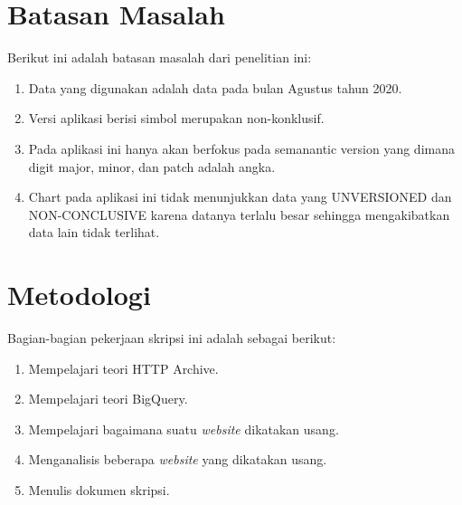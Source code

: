 \section{Batasan Masalah}
\label{sec:batasan}
Berikut ini adalah batasan masalah dari penelitian ini:
\begin{enumerate}
    \item Data yang digunakan adalah data pada bulan Agustus tahun 2020.
    \item Versi aplikasi berisi simbol merupakan non-konklusif.
    \item Pada aplikasi ini hanya akan berfokus pada semanantic version yang dimana digit major, minor, dan patch adalah angka.
    \item Chart pada aplikasi ini tidak menunjukkan data yang UNVERSIONED dan NON-CONCLUSIVE karena datanya terlalu besar sehingga mengakibatkan data lain tidak terlihat.
\end{enumerate}

\section{Metodologi}
\label{sec:metlit}
Bagian-bagian pekerjaan skripsi ini adalah sebagai berikut:
\begin{enumerate}
	\item Mempelajari teori HTTP Archive.
	\item Mempelajari teori BigQuery.
	\item Mempelajari bagaimana suatu \textit{website} dikatakan usang.
	\item Menganalisis beberapa \textit{website} yang dikatakan usang.
	\item Menulis dokumen skripsi.
\end{enumerate}


